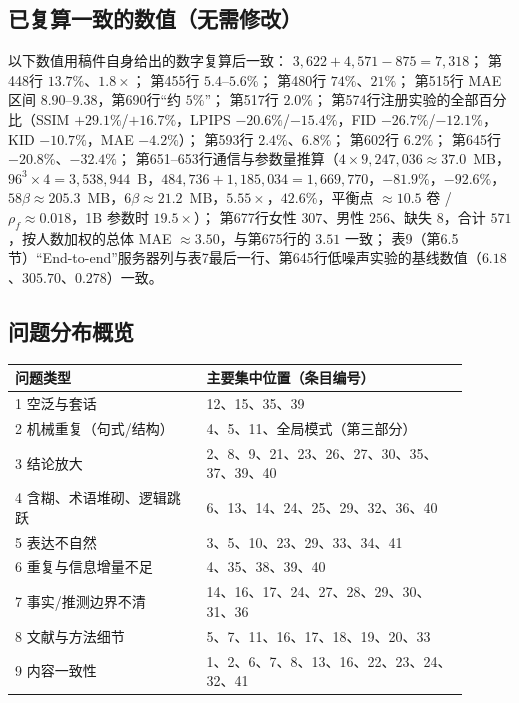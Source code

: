 \documentclass[11pt,a4paper]{ctexart}
\begin{document}
\subsection{已复算一致的数值（无需修改）}
以下数值用稿件自身给出的数字复算后一致：
$3{,}622+4{,}571-875=7{,}318$；
第448行 $13.7\%$、$1.8\times$；
第455行 $5.4$--$5.6\%$；
第480行 $74\%$、$21\%$；
第515行 MAE 区间 $8.90$--$9.38$，第690行“约 $5\%$”；
第517行 $2.0\%$；
第574行注册实验的全部百分比（SSIM $+29.1\%$/$+16.7\%$，LPIPS $-20.6\%$/$-15.4\%$，FID $-26.7\%$/$-12.1\%$，KID $-10.7\%$，MAE $-4.2\%$）；
第593行 $2.4\%$、$6.8\%$；
第602行 $6.2\%$；
第645行 $-20.8\%$、$-32.4\%$；
第651--653行通信与参数量推算（$4\times9{,}247{,}036\approx37.0$~MB，$96^3\times4=3{,}538{,}944$~B，$484{,}736+1{,}185{,}034=1{,}669{,}770$，$-81.9\%$，$-92.6\%$，$58\beta\approx205.3$~MB，$6\beta\approx21.2$~MB，$5.55\times$，$42.6\%$，平衡点 $\approx10.5$ 卷 / $\rho_f\approx0.018$，1B 参数时 $19.5\times$）；
第677行女性 $307$、男性 $256$、缺失 $8$，合计 $571$，按人数加权的总体 MAE $\approx3.50$，与第675行的 $3.51$ 一致；
表9（第6.5节）“End-to-end”服务器列与表7最后一行、第645行低噪声实验的基线数值（$6.18$、$305.70$、$0.278$）一致。

\subsection{问题分布概览}
\begin{center}
\small
\begin{tabular}{p{0.38\linewidth}p{0.52\linewidth}}
\toprule
问题类型 & 主要集中位置（条目编号） \\
\midrule
1 空泛与套话 & 12、15、35、39 \\
2 机械重复（句式/结构） & 4、5、11、全局模式（第三部分） \\
3 结论放大 & 2、8、9、21、23、26、27、30、35、37、39、40 \\
4 含糊、术语堆砌、逻辑跳跃 & 6、13、14、24、25、29、32、36、40 \\
5 表达不自然 & 3、5、10、23、29、33、34、41 \\
6 重复与信息增量不足 & 4、35、38、39、40 \\
7 事实/推测边界不清 & 14、16、17、24、27、28、29、30、31、36 \\
8 文献与方法细节 & 5、7、11、16、17、18、19、20、33 \\
9 内容一致性 & 1、2、6、7、8、13、16、22、23、24、32、41 \\
\bottomrule
\end{tabular}
\end{center}
\end{document}
